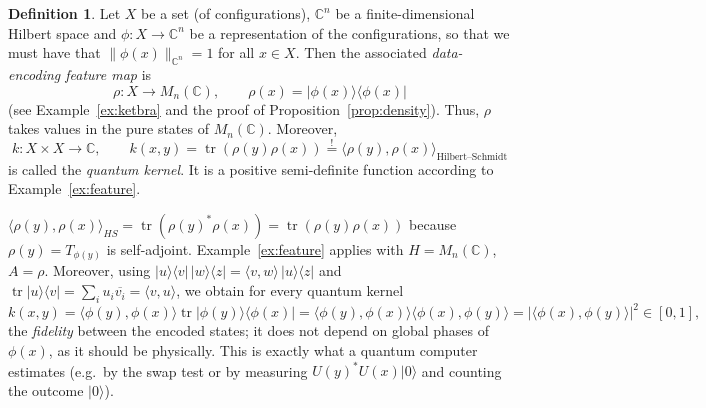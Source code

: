 \documentclass[11pt,a4paper]{article}
\numberwithin{equation}{section}
\newcommand{\C}{\mathbb{C}}
\newcommand{\ip}[2]{\langle #1, #2\rangle}
\newcommand{\ket}[1]{|#1\rangle}
\newcommand{\ketbra}[2]{|#1\rangle\langle #2|}
\newcommand{\conj}[1]{\overline{#1}}
\DeclareMathOperator{\tr}{tr}
\theoremstyle{plain}
\theoremstyle{definition}
\newtheorem{definition}[theorem]{Definition}
\theoremstyle{plain}
\theoremstyle{definition}
\begin{document}
\begin{definition}\label{def:qkernel}
Let $X$ be a set (of configurations), $\C^n$ be a finite-dimensional Hilbert space and
$\phi:X\to\C^n$ be a representation of the configurations, so that we must have that
$\|\phi(x)\|_{\C^n}=1$ for all $x\in X$. Then the associated \emph{data-encoding feature map} is
\[
\rho:X\to M_n(\C),\qquad\rho(x)=\ketbra{\phi(x)}{\phi(x)}
\]
(see Example~\ref{ex:ketbra} and the proof of Proposition~\ref{prop:density}). Thus, $\rho$
takes values in the pure states of $M_n(\C)$. Moreover,
\[
k:X\times X\to\C,\qquad k(x,y)=\tr(\rho(y)\rho(x))\overset{!}{=}\ip{\rho(y)}{\rho(x)}_{\text{Hilbert--Schmidt}}
\]
is called the \emph{quantum kernel}. It is a positive semi-definite function according to
Example~\ref{ex:feature}.
\end{definition}

\begin{addition}[(the ``$\overset{!}{=}$'' and a closed formula)]
$\ip{\rho(y)}{\rho(x)}_{HS}=\tr(\rho(y)^*\rho(x))=\tr(\rho(y)\rho(x))$ because
$\rho(y)=T_{\phi(y)}$ is self-adjoint. Example~\ref{ex:feature} applies with $H=M_n(\C)$,
$A=\rho$. Moreover, using $\ketbra uv\,\ketbra wz=\ip vw\,\ketbra uz$ and
$\tr\ketbra uv=\sum_iu_i\conj{v_i}=\ip vu$, we obtain for every quantum kernel
\[
k(x,y)=\ip{\phi(y)}{\phi(x)}\tr\ketbra{\phi(y)}{\phi(x)}=\ip{\phi(y)}{\phi(x)}\ip{\phi(x)}{\phi(y)}
=|\ip{\phi(x)}{\phi(y)}|^2\in[0,1],
\]
the \emph{fidelity} between the encoded states; it does not depend on global phases of
$\phi(x)$, as it should be physically. This is exactly what a quantum computer estimates
(e.g.\ by the swap test or by measuring $U(y)^*U(x)\ket0$ and counting the outcome $\ket0$).
\end{addition}
\end{document}
